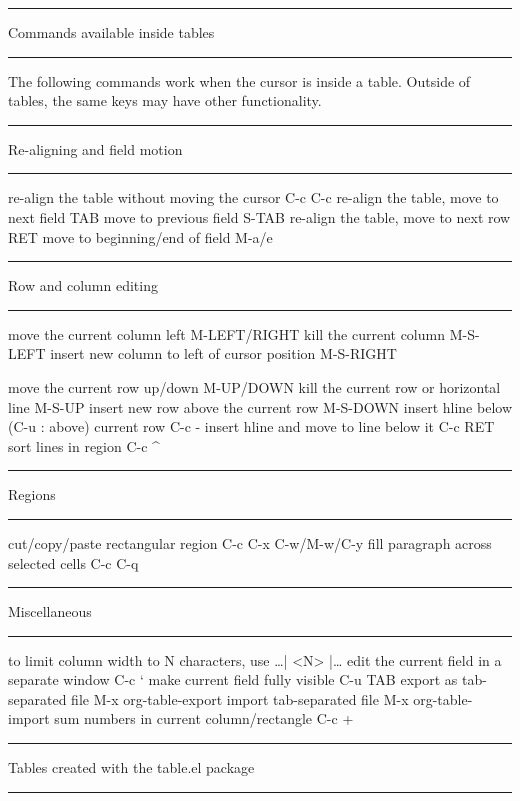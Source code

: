 \documentclass[10pt,a4paper]{article}
\begin{document}
\rule{\linewidth}{0.5pt}
Commands available inside tables

\rule{\linewidth}{0.5pt}

The following commands work when the cursor is inside a table.
Outside of tables, the same keys may have other functionality.

\rule{\linewidth}{0.5pt}
Re-aligning and field motion

\rule{\linewidth}{0.5pt}

re-align the table without moving the cursor      C-c C-c
re-align the table, move to next field            TAB
move to previous field                            S-TAB
re-align the table, move to next row              RET
move to beginning/end of field                    M-a/e

\rule{\linewidth}{0.5pt}
Row and column editing

\rule{\linewidth}{0.5pt}

move the current column left                      M-LEFT/RIGHT
kill the current column                           M-S-LEFT
insert new column to left of cursor position      M-S-RIGHT

move the current row up/down                      M-UP/DOWN
kill the current row or horizontal line           M-S-UP
insert new row above the current row              M-S-DOWN
insert hline below (C-u : above) current row      C-c -
insert hline and move to line below it            C-c RET
sort lines in region                              C-c \^{}

\rule{\linewidth}{0.5pt}
Regions

\rule{\linewidth}{0.5pt}

cut/copy/paste rectangular region                 C-c C-x C-w/M-w/C-y
fill paragraph across selected cells              C-c C-q

\rule{\linewidth}{0.5pt}
Miscellaneous

\rule{\linewidth}{0.5pt}

to limit column width to N characters, use        \ldots{}| <N> |\ldots{}
edit the current field in a separate window       C-c `
make current field fully visible                  C-u TAB
export as tab-separated file                      M-x org-table-export
import tab-separated file                         M-x org-table-import
sum numbers in current column/rectangle           C-c +

\rule{\linewidth}{0.5pt}
Tables created with the table.el package

\rule{\linewidth}{0.5pt}
\end{document}
